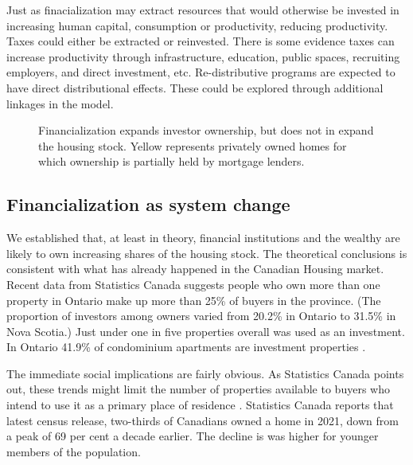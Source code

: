 Just as finacialization may extract resources that would otherwise be invested in increasing human capital, consumption or productivity, reducing productivity. Taxes could either be extracted or reinvested. There is some evidence taxes can increase productivity through infrastructure, education, public spaces, recruiting employers, and direct investment, etc. Re-distributive programs are expected to have direct distributional effects. These could be explored through additional linkages in the model.



\begin{figure}[ht]
\begin{center}

\end{center}
\caption{Financialization expands investor ownership, but does not in expand the housing stock. Yellow represents privately owned homes for which ownership is partially held by mortgage lenders.}
\label{fig-financialization-expansion}
\end{figure}


\subsection{Financialization as system change} \label{section-system}
We established that, at least in theory, financial institutions and the wealthy are likely to own increasing shares of the housing stock. The theoretical conclusions is consistent with what has already happened in the Canadian Housing market. Recent data from Statistics Canada \cite{fontaineResidentialRealEstate2023} suggests people who own more than one property in Ontario make up more than 25\% of buyers in the province. (The proportion of investors among owners varied from 20.2\% in Ontario to 31.5\% in Nova Scotia.)
Just under one in five properties overall was used as an investment.
In Ontario 41.9\% of condominium apartments are investment properties \cite{statisticscanadaBuyRentHousing2022}.

The immediate social implications are fairly obvious. As Statistics Canada points out, these trends might limit the number of properties available to buyers who intend to use it as a primary place of residence  \cite{fontaineResidentialRealEstate2023}. Statistics Canada reports that latest census release, two-thirds of Canadians owned a home in 2021, down from a peak of 69 per cent a decade earlier. The decline is was higher for younger members of the population. 

